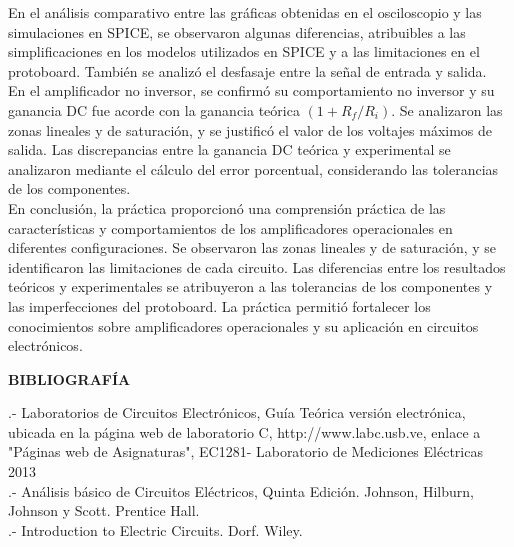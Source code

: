 \documentclass[12pt]{article}
\begin{document}
	En el análisis comparativo entre las gráficas obtenidas en el osciloscopio y las simulaciones en SPICE, se observaron algunas diferencias, atribuibles a las simplificaciones en los modelos utilizados en SPICE y a las limitaciones en el protoboard. También se analizó el desfasaje entre la señal de entrada y salida.\\
	
	En el amplificador no inversor, se confirmó su comportamiento no inversor y su ganancia DC fue acorde con la ganancia teórica $(1 + R_{f}/R_{i})$. Se analizaron las zonas lineales y de saturación, y se justificó el valor de los voltajes máximos de salida. Las discrepancias entre la ganancia DC teórica y experimental se analizaron mediante el cálculo del error porcentual, considerando las tolerancias de los componentes.\\
	
	En conclusión, la práctica proporcionó una comprensión práctica de las características y comportamientos de los amplificadores operacionales en diferentes configuraciones. Se observaron las zonas lineales y de saturación, y se identificaron las limitaciones de cada circuito. Las diferencias entre los resultados teóricos y experimentales se atribuyeron a las tolerancias de los componentes y las imperfecciones del protoboard. La práctica permitió fortalecer los conocimientos sobre amplificadores operacionales y su aplicación en circuitos electrónicos.\\
	
	\newpage
	
	\begin{center}
		\textbf{\large BIBLIOGRAFÍA}\\
	\end{center}
	
	.- Laboratorios de Circuitos Electrónicos, Guía Teórica versión electrónica, ubicada en la página web de laboratorio C, http://www.labc.usb.ve, enlace a "Páginas web de Asignaturas", EC1281- Laboratorio de Mediciones Eléctricas 2013\\
	
	.- Análisis básico de Circuitos Eléctricos, Quinta Edición. Johnson, Hilburn, Johnson y Scott. Prentice Hall.\\
	
	.- Introduction to Electric Circuits. Dorf. Wiley.
	
\end{document}

